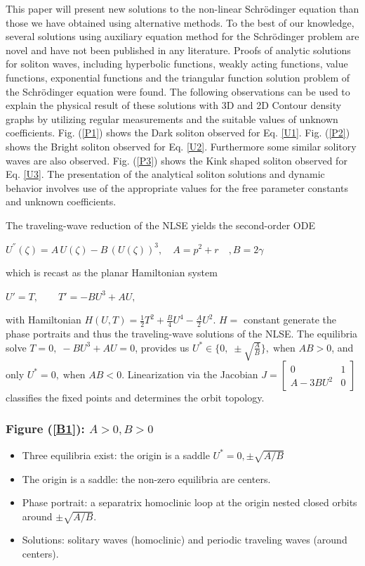 \documentclass[10pt]{NSP1}
\numberwithin{equation}{section}
\begin{document}
This paper will present new solutions to the non-linear Schr\"odinger equation than those we have obtained using alternative methods. To the best of our knowledge, several solutions using auxiliary equation method for the Schr\"odinger problem are novel and have not been published in any literature. Proofs of analytic solutions for soliton waves, including hyperbolic functions, weakly acting functions, value functions, exponential functions and the triangular function solution problem of the Schr\"odinger equation were found. The following observations can be used to explain the physical result of these solutions with 3D and 2D Contour density graphs by utilizing regular measurements and the suitable values of unknown coefficients. Fig. (\ref{P1}) shows the Dark soliton observed for Eq. \ref{U1}. Fig. (\ref{P2}) shows the Bright soliton observed for Eq. \ref{U2}. Furthermore some similar solitory waves are also observed. Fig. (\ref{P3}) shows the Kink shaped soliton observed for Eq. \ref{U3}. The presentation of the analytical soliton solutions and dynamic behavior involves use of the appropriate values for the free parameter constants and unknown coefficients.

The traveling-wave reduction of the NLSE yields the second-order ODE
\begin{center}
    $U^{''}{(\zeta)}=A\,U \! \left(\zeta \right)-B\,\! \left(U \! \left(\zeta \right)\right)^{3},\quad A=p^2+r\quad, B=2\gamma$
\end{center}
which is recast as the planar Hamiltonian system
\begin{center}
    $U' = T, \qquad T' = -BU^3 + AU,$
\end{center}
with Hamiltonian $H(U,T) = \tfrac{1}{2}T^2 + \tfrac{B}{4}U^4 - \tfrac{A}{2}U^2.$ $H=$ constant generate the phase portraits and thus the traveling-wave solutions of the NLSE. The equilibria solve $T = 0, \; -BU^3 + AU = 0$, provides us $U^\ast \in \Big\{ 0, \; \pm \sqrt{\tfrac{A}{B}} \Big\}, \; \text{when } AB>0$,
and only $U^\ast = 0, \; \text{when } AB<0.$
Linearization via the Jacobian
    $J =
    \begin{bmatrix}
        0 & 1 \\
        A - 3B U^2 & 0
    \end{bmatrix}$
classifies the fixed points and determines the orbit topology.

\subsubsection*{Figure (\ref{B1}): $A>0, B>0$}
\begin{itemize}
    \item Three equilibria exist: the origin is a saddle $U^\ast = 0, \pm \sqrt{A/B}$
    \item The origin is a saddle: the non-zero equilibria are centers.
    \item Phase portrait: a separatrix homoclinic loop at the origin nested closed orbits around $\pm \sqrt{A/B}$.
    \item Solutions: solitary waves (homoclinic) and periodic traveling waves (around centers).
\end{itemize}
\end{document}
